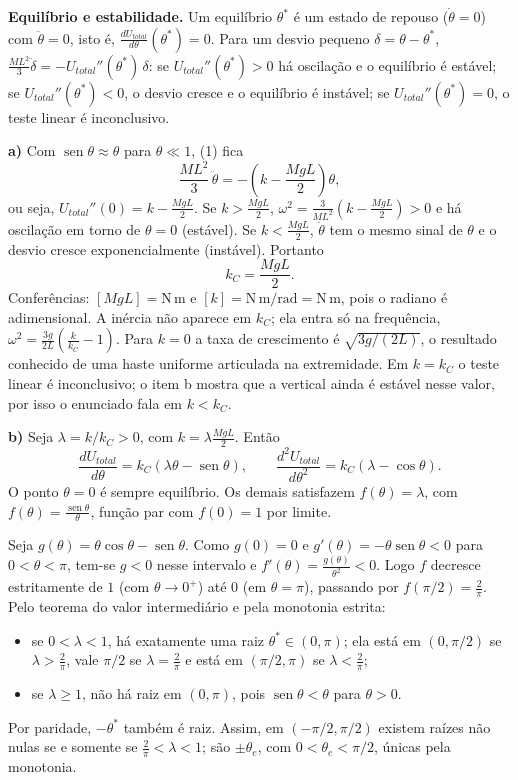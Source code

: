 \documentclass{article}%
\begin{document}
\textbf{Equilíbrio e estabilidade.} Um equilíbrio $\theta^*$ é um estado de repouso ($\dot\theta=0$) com $\ddot\theta=0$, isto é, $\frac{dU_{total}}{d\theta}(\theta^*)=0$. Para um desvio pequeno $\delta=\theta-\theta^*$, $\frac{ML^2}{3}\ddot\delta=-U_{total}''(\theta^*)\,\delta$: se $U_{total}''(\theta^*)>0$ há oscilação e o equilíbrio é estável; se $U_{total}''(\theta^*)<0$, o desvio cresce e o equilíbrio é instável; se $U_{total}''(\theta^*)=0$, o teste linear é inconclusivo.

\textbf{a)} Com $\operatorname{sen}\theta\approx\theta$ para $\theta\ll 1$, (1) fica
\[
\frac{ML^2}{3}\,\ddot{\theta}=-\left(k-\frac{MgL}{2}\right)\theta,
\]
ou seja, $U_{total}''(0)=k-\frac{MgL}{2}$. Se $k>\frac{MgL}{2}$, $\omega^2=\frac{3}{ML^2}\left(k-\frac{MgL}{2}\right)>0$ e há oscilação em torno de $\theta=0$ (estável). Se $k<\frac{MgL}{2}$, $\ddot\theta$ tem o mesmo sinal de $\theta$ e o desvio cresce exponencialmente (instável). Portanto
\[
k_C=\frac{MgL}{2}.
\]
Conferências: $[MgL]=\mathrm{N\,m}$ e $[k]=\mathrm{N\,m/rad}=\mathrm{N\,m}$, pois o radiano é adimensional. A inércia não aparece em $k_C$; ela entra só na frequência, $\omega^2=\frac{3g}{2L}\left(\frac{k}{k_C}-1\right)$. Para $k=0$ a taxa de crescimento é $\sqrt{3g/(2L)}$, o resultado conhecido de uma haste uniforme articulada na extremidade. Em $k=k_C$ o teste linear é inconclusivo; o item b mostra que a vertical ainda é estável nesse valor, por isso o enunciado fala em $k<k_C$.

\textbf{b)} Seja $\lambda=k/k_C>0$, com $k=\lambda\frac{MgL}{2}$. Então
\[
\frac{dU_{total}}{d\theta}=k_C\left(\lambda\theta-\operatorname{sen}\theta\right),\qquad \frac{d^2U_{total}}{d\theta^2}=k_C\left(\lambda-\cos\theta\right).
\]
O ponto $\theta=0$ é sempre equilíbrio. Os demais satisfazem $f(\theta)=\lambda$, com $f(\theta)=\frac{\operatorname{sen}\theta}{\theta}$, função par com $f(0)=1$ por limite.

Seja $g(\theta)=\theta\cos\theta-\operatorname{sen}\theta$. Como $g(0)=0$ e $g'(\theta)=-\theta\operatorname{sen}\theta<0$ para $0<\theta<\pi$, tem-se $g<0$ nesse intervalo e $f'(\theta)=\frac{g(\theta)}{\theta^2}<0$. Logo $f$ decresce estritamente de $1$ (com $\theta\to0^+$) até $0$ (em $\theta=\pi$), passando por $f(\pi/2)=\frac{2}{\pi}$. Pelo teorema do valor intermediário e pela monotonia estrita:
\begin{itemize}
\item se $0<\lambda<1$, há exatamente uma raiz $\theta^*\in(0,\pi)$; ela está em $(0,\pi/2)$ se $\lambda>\frac{2}{\pi}$, vale $\pi/2$ se $\lambda=\frac{2}{\pi}$ e está em $(\pi/2,\pi)$ se $\lambda<\frac{2}{\pi}$;
\item se $\lambda\ge 1$, não há raiz em $(0,\pi)$, pois $\operatorname{sen}\theta<\theta$ para $\theta>0$.
\end{itemize}
Por paridade, $-\theta^*$ também é raiz. Assim, em $(-\pi/2,\pi/2)$ existem raízes não nulas se e somente se $\frac{2}{\pi}<\lambda<1$; são $\pm\theta_e$, com $0<\theta_e<\pi/2$, únicas pela monotonia.
\end{document}
